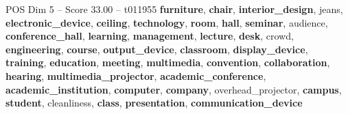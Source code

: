 \begin{textsample}{POS Dim 5 – Score 33.00 – t011955}  \label{ex:f5_pos_011}
\textbf{furniture}, \textbf{chair}, \textbf{interior\_design}, jeans, \textbf{electronic\_device}, \textbf{ceiling}, \textbf{technology}, \textbf{room}, \textbf{hall}, \textbf{seminar}, audience, \textbf{conference\_hall}, \textbf{learning}, \textbf{management}, \textbf{lecture}, \textbf{desk}, crowd, \textbf{engineering}, \textbf{course}, \textbf{output\_device}, \textbf{classroom}, \textbf{display\_device}, \textbf{training}, \textbf{education}, \textbf{meeting}, \textbf{multimedia}, \textbf{convention}, \textbf{collaboration}, \textbf{hearing}, \textbf{multimedia\_projector}, \textbf{academic\_conference}, \textbf{academic\_institution}, \textbf{computer}, \textbf{company}, overhead\_projector, \textbf{campus}, \textbf{student}, cleanliness, \textbf{class}, \textbf{presentation}, \textbf{communication\_device}

\end{textsample}
